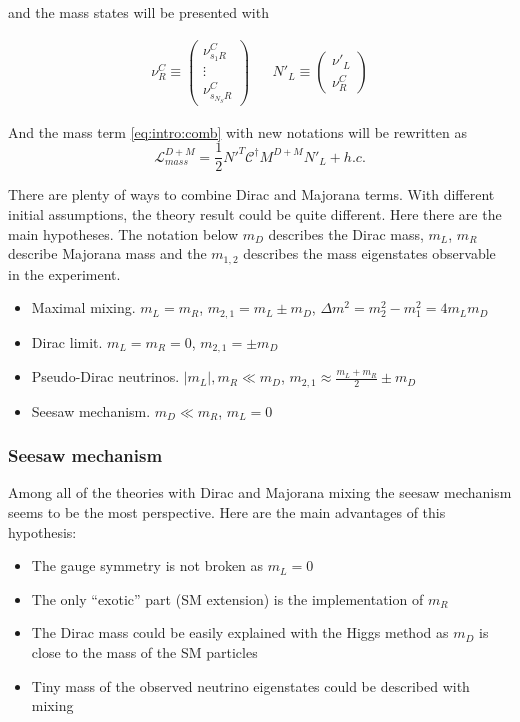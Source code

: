 \documentclass[../main.tex]{subfiles}
\begin{document}
and the mass states will be presented with

\begin{align}
\nu_R^C\equiv
\begin{pmatrix}
\nu^C_{s_1R} \\
\vdots \\
\nu^C_{s_{N_S}R}
\end{pmatrix}
&&
N'_L\equiv
\begin{pmatrix}
\nu'_L \\ \nu^C_R
\end{pmatrix}
\end{align}

And the mass term \autoref{eq:intro:comb} with new notations will be rewritten as
\begin{equation}
\mathcal{L}_{mass}^{D+M}=\frac{1}{2}N'^T\mathcal{C}^\dagger M^{D+M}N'_L+h.c.
\end{equation}

There are plenty of ways to combine Dirac and Majorana terms. With different initial assumptions, the theory result could be quite different. Here there are the main hypotheses. The notation below $m_D$ describes the Dirac mass, $m_L$, $m_R$ describe Majorana mass and the $m_{1,2}$ describes the mass eigenstates observable in the experiment.
\begin{itemize}
  \item Maximal mixing. $m_L=m_R$, $m_{2, 1}=m_L\pm m_D$, $\Delta m^2=m_2^2-m_1^2=4m_L m_D$
  \item Dirac limit. $m_L=m_R=0$, $m_{2,1}=\pm m_D$
  \item Pseudo-Dirac neutrinos. $\left|m_L\right|,m_R \ll m_D$, $m_{2,1}\approx\frac{m_L+m_R}{2}\pm m_D$
  \item Seesaw mechanism. $m_D \ll m_R$, $m_L=0$
\end{itemize}

\subsubsection{Seesaw mechanism}
Among all of the theories with Dirac and Majorana mixing the seesaw mechanism seems to be the most perspective. Here are the main advantages of this hypothesis:
\begin{itemize}
  \item The gauge symmetry is not broken as $m_L=0$
  \item The only ``exotic'' part (SM extension) is the implementation of $m_R$
  \item The Dirac mass could be easily explained with the Higgs method as $m_D$ is close to the mass of the SM particles
  \item Tiny mass of the observed neutrino eigenstates could be described with mixing
\end{itemize}
\end{document}

